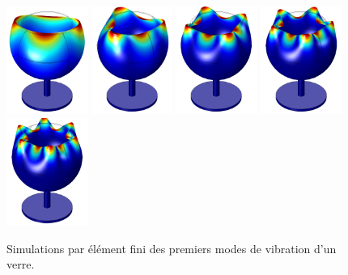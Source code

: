 \documentclass[12pt,a4paper]{article}
\begin{document}
\begin{figure}[b]
\center
\includegraphics[height=100pt]{figures/wine_glass_f0.png}
\hfill
\includegraphics[height=100pt]{figures/wine_glass_f1.png}
\hfill
\includegraphics[height=100pt]{figures/wine_glass_f2.png}
\hfill
\includegraphics[height=100pt]{figures/wine_glass_f3.png}
\hfill
\includegraphics[height=100pt]{figures/wine_glass_f4.png}
\caption{Simulations par élément fini des premiers modes de vibration d'un verre.}
\label{fig:wine_glass}
\end{figure}
\end{document}
